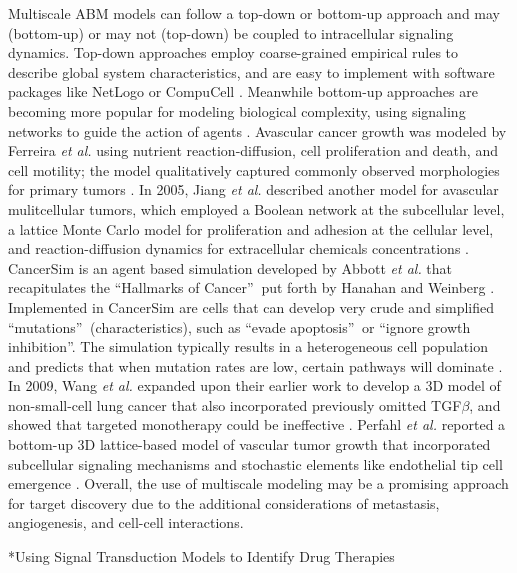 \documentclass[12pt]{article}
\makeatletter
\renewcommand\section{\@startsection
	{subsection}{2}{0mm}
	{-0.2in}
	{0.05\baselineskip}
	{\normalfont\large\bfseries}}
\makeatother
\begin{document}
Multiscale ABM models \cite{Kaul2013} can follow a top-down or bottom-up approach and may (bottom-up) or may not (top-down) be coupled to intracellular signaling dynamics. Top-down approaches employ coarse-grained empirical rules to describe global system characteristics, and are easy to implement with software packages like NetLogo \cite{Sklar2007} or CompuCell \cite{Andasari2012}. Meanwhile bottom-up approaches are becoming more popular for modeling biological complexity, using signaling networks to guide the action of agents \cite{Chakrabarti2012}. Avascular cancer growth was modeled by Ferreira \textit{et al.} using nutrient reaction-diffusion, cell proliferation and death, and cell motility; the model qualitatively captured commonly observed morphologies for primary tumors \cite{Ferreira2002}. In 2005, Jiang \textit{et al.} described another model for avascular mulitcellular tumors, which employed a Boolean network at the subcellular level, a lattice Monte Carlo model for proliferation and adhesion at the cellular level, and reaction-diffusion dynamics for extracellular chemicals concentrations \cite{Jiang2005}. 
CancerSim is an agent based simulation developed by Abbott \textit{et al.} that recapitulates the \textquotedblleft Hallmarks of Cancer\textquotedblright $\:$ put forth by Hanahan and Weinberg \cite{Abbott2006}. Implemented in CancerSim are cells that can develop very crude and simplified \textquotedblleft mutations\textquotedblright $\:$ (characteristics), such as \textquotedblleft evade apoptosis\textquotedblright $\:$ or \textquotedblleft ignore growth inhibition\textquotedblright. The simulation typically results in a heterogeneous cell population and predicts that when mutation rates are low, certain pathways will dominate \cite{Abbott2006}. In 2009, Wang \textit{et al.} expanded upon their earlier work to develop a 3D model of non-small-cell lung cancer that also incorporated previously omitted TGF$\beta$, and showed that targeted monotherapy could be ineffective \cite{Wang2009}. Perfahl \textit{et al.} reported a bottom-up 3D lattice-based model of vascular tumor growth that incorporated subcellular signaling mechanisms and stochastic elements like endothelial tip cell emergence \cite{Perfahl2011}. 
Overall, the use of multiscale modeling may be a promising approach for target discovery due to the additional considerations of metastasis, angiogenesis, and cell-cell interactions. 

\section*{Using Signal Transduction Models to Identify Drug Therapies}
\end{document}
